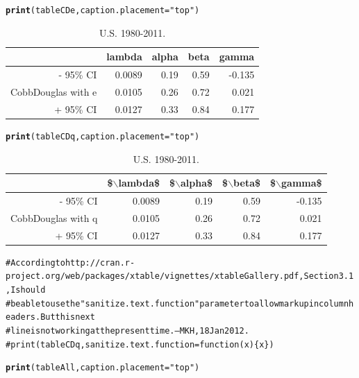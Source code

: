 \documentclass[preprint,authoryear,12pt]{elsarticle}\usepackage{graphicx, color}
\makeatletter
\newcommand{\hlfunctioncall}[1]{\textcolor[rgb]{0.501960784313725,0,0.329411764705882}{\textbf{#1}}}%
\newcommand{\hlstring}[1]{\textcolor[rgb]{0.6,0.6,1}{#1}}%
\newcommand{\hlcomment}[1]{\textcolor[rgb]{0.180392156862745,0.6,0.341176470588235}{#1}}%
\newenvironment{kframe}{%
 \def\at@end@of@kframe{}%
 \ifinner\ifhmode%
  \def\at@end@of@kframe{\end{minipage}}%
  \begin{minipage}{\columnwidth}%
 \fi\fi%
 \def\FrameCommand##1{\hskip\@totalleftmargin \hskip-\fboxsep
 \colorbox{shadecolor}{##1}\hskip-\fboxsep
     \hskip-\linewidth \hskip-\@totalleftmargin \hskip\columnwidth}%
 \MakeFramed {\advance\hsize-\width
   \@totalleftmargin\z@ \linewidth\hsize
   \@setminipage}}%
 {\par\unskip\endMakeFramed%
 \at@end@of@kframe}
\makeatother
\begin{document}
\begin{kframe}
\begin{alltt}

\hlfunctioncall{print}(tableCDe, caption.placement=\hlstring{"top"})
\end{alltt}
\end{kframe}%
\begin{table}[ht]
\begin{center}
\caption{U.S. 1980-2011.}
\begin{tabular}{rrrrr}
  \hline
 & lambda & alpha & beta & gamma \\ 
  \hline
- 95\% CI & 0.0089 & 0.19 & 0.59 & -0.135 \\ 
  CobbDouglas with e & 0.0105 & 0.26 & 0.72 & 0.021 \\ 
  + 95\% CI & 0.0127 & 0.33 & 0.84 & 0.177 \\ 
   \hline
\end{tabular}
\end{center}
\end{table}
\begin{kframe}\begin{alltt}
\hlfunctioncall{print}(tableCDq, caption.placement=\hlstring{"top"})
\end{alltt}
\end{kframe}%
\begin{table}[ht]
\begin{center}
\caption{U.S. 1980-2011.}
\begin{tabular}{rrrrr}
  \hline
 & \$$\backslash$lambda\$ & \$$\backslash$alpha\$ & \$$\backslash$beta\$ & \$$\backslash$gamma\$ \\ 
  \hline
- 95\% CI & 0.0089 & 0.19 & 0.59 & -0.135 \\ 
  CobbDouglas with q & 0.0105 & 0.26 & 0.72 & 0.021 \\ 
  + 95\% CI & 0.0127 & 0.33 & 0.84 & 0.177 \\ 
   \hline
\end{tabular}
\end{center}
\end{table}
\begin{kframe}\begin{alltt}
\hlcomment{# According to http://cran.r-project.org/web/packages/xtable/vignettes/xtableGallery.pdf, Section 3.1, I should }
\hlcomment{# be able to use the "sanitize.text.function" parameter to allow markup in column headers. But this next}
\hlcomment{# line is not working at the present time. --MKH, 18 Jan 2012.}
\hlcomment{# print(tableCDq, sanitize.text.function = function(x)\{x\})}

\hlfunctioncall{print}(tableAll, caption.placement=\hlstring{"top"})
\end{alltt}
\end{kframe}%
\end{document}
